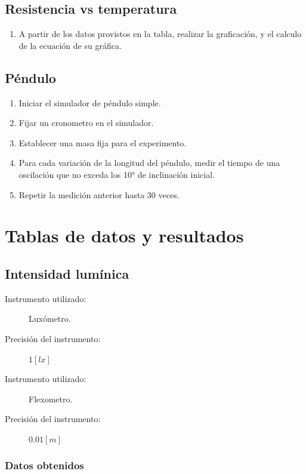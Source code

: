 \documentclass[letter,11pt]{article}
\begin{document}
\subsection{Resistencia vs temperatura}
\begin{enumerate}
\item A partir de los datos provistos en la tabla, realizar la graficación,
y el calculo de la ecuación de su gráfica.
\end{enumerate}

\subsection{Péndulo}
\begin{enumerate}
\item Iniciar el simulador de péndulo simple.
\item Fijar un cronometro en el simulador.
\item Establecer una masa fija para el experimento.
\item Para cada variación de la longitud del péndulo, medir el tiempo de una
oscilación que no exceda los 10° de inclinación inicial.
\item Repetir la medición anterior hasta 30 veces.
\end{enumerate}

\section{Tablas de datos y resultados}

\subsection{Intensidad lumínica}

\begin{description}
\item[Instrumento utilizado:] Luxómetro.
\item[Precisión del instrumento:] $1 [lx]$
\item[Instrumento utilizado:] Flexometro.
\item[Precisión del instrumento:] $0.01 [m]$
\end{description}

\subsubsection{Datos obtenidos}
\end{document}
